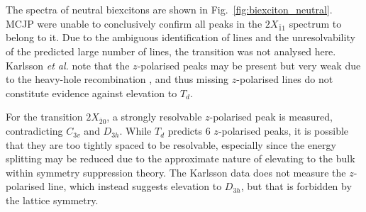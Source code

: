The spectra of neutral biexcitons are shown in Fig.~\ref{fig:biexciton_neutral}. MCJP were unable to conclusively confirm all peaks in the $2X_{\bar{1}1}$ spectrum to belong to it. Due to the ambiguous identification of lines and the unresolvability of the predicted large number of lines, the transition was not analysed here. Karlsson \textit{et al.} note that the $z$-polarised peaks may be present but very weak due to the heavy-hole recombination \cite[p.~16]{karlsson}, and thus missing $z$-polarised lines do not constitute evidence against elevation to $T_d$.

For the transition $2X_{\bar{2}0}$, a strongly resolvable $z$-polarised peak is measured, contradicting $C_{3v}$ and $D_{3h}$. While $T_d$ predicts $6$ $z$-polarised peaks, it is possible that they are too tightly spaced to be resolvable, especially since the energy splitting may be reduced due to the approximate nature of elevating to the bulk within symmetry suppression theory. The Karlsson data does not measure the $z$-polarised line, which instead suggests elevation to $D_{3h}$, but that is forbidden by the lattice symmetry.\\

